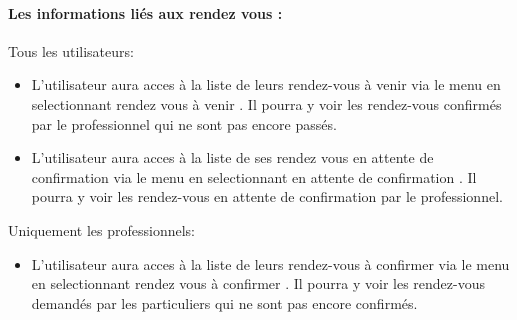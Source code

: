 \documentclass{article}
\begin{document}
\paragraph{Les informations liés aux rendez vous :}
Tous les utilisateurs:
\begin{itemize}
\item L'utilisateur aura acces à la liste de leurs rendez-vous à venir via le menu en selectionnant \og rendez vous à venir \fg{}.
Il pourra y voir les rendez-vous confirmés par le professionnel qui ne sont pas encore passés.

\item L'utilisateur aura acces à la liste de ses rendez vous en attente de confirmation via le menu en selectionnant \og en attente de confirmation \fg{}.
Il pourra y voir les rendez-vous en attente de confirmation par le professionnel.


\end{itemize}
Uniquement les professionnels:
\begin{itemize}
\item L'utilisateur aura acces à la liste de leurs rendez-vous à confirmer via le menu en selectionnant \og rendez vous à confirmer \fg{}.
Il pourra y voir les rendez-vous demandés par les particuliers qui ne sont pas encore confirmés.

\end{itemize}
\end{document}
